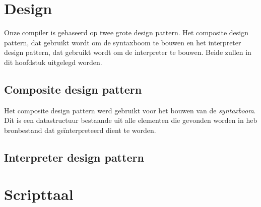 \documentclass[10pt,a4paper]{article}
\begin{document}
\section{Design}
Onze compiler is gebaseerd op twee grote design pattern. Het composite design pattern, dat gebruikt wordt om de syntaxboom te bouwen en het interpreter design pattern, dat gebruikt wordt om de interpreter te bouwen. Beide zullen in dit hoofdstuk uitgelegd worden.

\subsection{Composite design pattern}
Het composite design pattern werd gebruikt voor het bouwen van de \emph{syntaxboom}. Dit is een datastructuur bestaande uit alle elementen die gevonden worden in heb bronbestand dat geïnterpreteerd dient te worden.

\subsection{Interpreter design pattern}

\section{Scripttaal}
\end{document}
